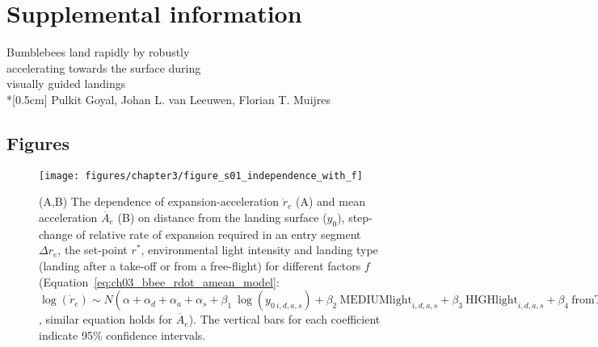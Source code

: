 \chapter*{Supplemental information}
\renewcommand{\thesection}{S\arabic{section}}
\renewcommand{\thesubsection}{S\arabic{section}.\arabic{subsection}}
\renewcommand{\thesubsubsection}{S\arabic{section}.\arabic{subsection}.\arabic{subsubsection}}
\renewcommand{\theequation}{S\arabic{equation}}
\renewcommand{\thefigure}{S\arabic{figure}}
\renewcommand{\thetable}{S\arabic{table}}
\setcounter{section}{0}
\setcounter{subsection}{0}
\setcounter{equation}{0}
\setcounter{figure}{0}
\setcounter{table}{0}

\vspace*{3cm}
{\huge Bumblebees land rapidly by robustly \\ accelerating towards the surface during \\ visually guided landings}
\\*[0.5cm]
{\large Pulkit Goyal, Johan L. van Leeuwen, Florian T. Muijres}
\clearpage

\section{Figures}
\label{sec:s3_figures}
\begin{figure}[H]
	\centering
	\texttt{[image: figures/chapter3/figure\_s01\_independence\_with\_f]}
	\caption{ (A,B) The dependence of expansion-acceleration $\dot{r}_e$ (A) and mean acceleration $\overline{A}_e$ (B) on distance from the landing surface ($y_0$), step-change of relative rate of expansion required in an entry segment $\Delta r_e$, the set-point $r^*$, environmental light intensity and landing type (landing after a take-off or from a free-flight) for different factors $f$ (Equation~\ref{eq:ch03_bbee_rdot_amean_model}: $ \log(\dot{r}_e) \sim N(\alpha + \alpha_d + \alpha_a + \alpha_s + \beta_1~\log(y_{0~i,d,a,s}) + \beta_2~\textrm{MEDIUMlight}_{i,d,a,s} + \beta_3~\textrm{HIGHlight}_{i,d,a,s} + \beta_4~\textrm{fromTakeoff}_{i,d,a,s} + \beta_5~\log(\Delta r_{e~i,d,a,s}) + \beta_6~\log(r^*_{i,d,a,s}) + \beta_7~\log(y_{0~i,d,a,s})\times \log(\Delta r_{e~i,d,a,s}),~\sigma^2)$, similar equation holds for $\overline{A}_e$). The vertical bars for each coefficient indicate 95\% confidence intervals.}
	\label{figure_s01_independence_with_f}
\end{figure}

